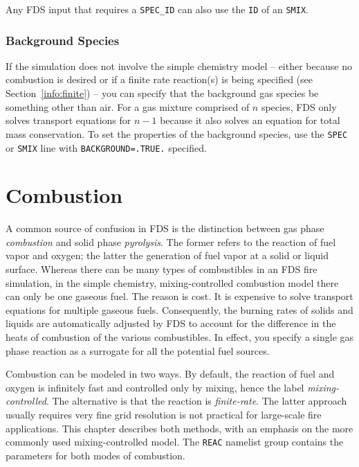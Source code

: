 \documentclass[11pt]{book}
\newcommand{\ct}{\tt\small}
\begin{document}
\noindent Any FDS input that requires a {\ct SPEC\_ID} can also use the {\ct ID} of an {\ct SMIX}.

\subsection{Background Species}

If the simulation does not involve the simple chemistry model -- either because no combustion is
desired or if a finite rate reaction(s) is being specified (see Section~\ref{info:finite}) -- you can
specify that the background gas species be something other than air. For a gas mixture comprised of
$n$ species, FDS only solves transport equations for $n-1$ because it also solves an equation for
total mass conservation. To set the properties of the background species, use the
{\ct SPEC} or {\ct SMIX} line with {\ct BACKGROUND=.TRUE.} specified.




\chapter{Combustion}

\label{chap:combustion}
\label{info:REAC}

A common source of confusion in FDS is the distinction between gas phase {\em combustion} and solid phase {\em pyrolysis}. The former
refers to the reaction of fuel vapor and oxygen; the latter the generation of fuel vapor at a solid or liquid surface. Whereas there
can be many types of combustibles in an FDS fire simulation, in the simple chemistry, mixing-controlled combustion model there can only be one gaseous fuel. The reason is cost.
It is expensive to
solve transport equations for multiple gaseous fuels. Consequently, the burning rates of solids and liquids are automatically adjusted by
FDS to account for the difference in the heats of combustion of the various combustibles. In effect, you specify a single gas phase
reaction as a surrogate for all the potential fuel sources.

Combustion can be modeled in two ways. By default, the reaction of fuel and oxygen is infinitely fast and controlled only by mixing, hence
the label {\em mixing-controlled}. The alternative is that the reaction is {\em finite-rate}. The latter approach usually requires very fine grid resolution is not
practical for large-scale fire applications. This chapter describes both methods, with an emphasis on the more
commonly used mixing-controlled model. The {\ct REAC} namelist group contains the parameters for both modes of combustion.
\end{document}
